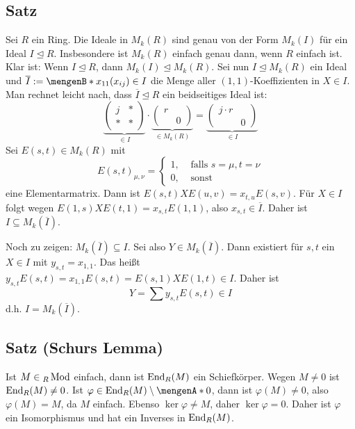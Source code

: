 \subsection[Satz über die Ideale eines Ringes $R$ und die Ideale in $M_k(R)$]{Satz} %
\label{sub:225}
Sei $R$ ein Ring. Die Ideale in $M_k(R)$ sind genau von der Form $M_k(I)$ für ein Ideal $I \unlhd R$. Insbesondere ist $M_k(R)$ einfach genau dann, wenn $R$ einfach ist.
Klar ist: Wenn $I \unlhd R$, dann $M_k(I) \unlhd M_k(R)$. Sei nun $I \unlhd M_k(R)$ ein Ideal und $\overline{I} := \set[x_{11}]{(x_{ij}) \in I}$ die Menge aller 
$(1,1)$-Koeffizienten in $X \in I$. Man rechnet leicht nach, dass $\overline{I} \unlhd R $ ein beidseitiges Ideal ist:
\[
	\underbrace{\begin{pmatrix}
		j & * \\
		* & *
	\end{pmatrix}}_{\in I} \cdot \underbrace{\begin{pmatrix}
		r & \\
		 & 0
	\end{pmatrix}}_{\in M_k(R)} = \underbrace{\begin{pmatrix}
		j \cdot r & \\
		& 0
	\end{pmatrix}}_{\in I}
\]
Sei $E(s,t) \in M_k(R)$ mit 
\[
	E(s,t)_{\mu, \nu} = \begin{cases}
		1, &\text{ falls }s= \mu, t= \nu \\
		0, &\text{ sonst }
	\end{cases}
\]
eine Elementarmatrix. Dann ist $E(s,t) X E(u,v) = x_{t,u} E(s,v)$. Für $X \in I$ folgt wegen $E(1,s) X E(t,1) = x_{s,t} E(1,1)$, also $x_{s,t} \in \overline{I}$. Daher ist
$I \subseteq M_k(\overline{I})$.

Noch zu zeigen: $M_k(\overline{I}) \subseteq I$. Sei also $Y \in M_k(\overline{I})$. Dann existiert für $s,t$ ein $X \in I$ mit $y_{s,t} = x_{1,1}$. Das heißt 
$y_{s,t} E(s,t) = x_{1,1} E(s,t) = E(s,1) X E(1,t) \in I$. Daher ist 
\[
	Y = \sum y_{s,t} E(s,t) \in I
\]
d.h. $I= M_k(\overline{I} )$. \bewende \smallskip \\

\subsection{Satz (Schurs Lemma)} %
\label{sub:226}
Ist $M \in {_R \operatorname{Mod}}$ einfach, dann ist $\operatorname{End}_R(M)$ ein Schiefkörper.
Wegen $M \not= 0$ ist $\operatorname{End}_R(M) \not= 0$. Ist $\varphi \in \End_R(M) \setminus \set{0}$, dann ist $\varphi(M) \not= 0$, also $\varphi(M)=M$, da $M$ einfach. Ebenso
$\ker \varphi \not= M$, daher $\ker \varphi = 0$. Daher ist $\varphi$ ein Isomorphismus und hat ein Inverses in $\operatorname{End}_R(M)$. \bewende 

